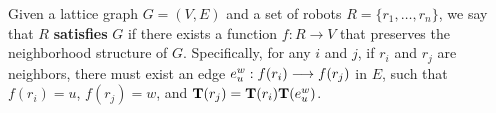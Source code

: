 \begin{figure}
  \centering
  
  \label{fig:edgetrans}
\end{figure}

\begin{defn}
\label{def:selfconsist}
  Given a lattice graph $G=(V, E)$ and a set of robots
    $R = \{ r_1, \ldots, r_n \}$,
  we say that $R$ \textbf{satisfies} $G$ if there exists a function
    $f: R \rightarrow V$
  that preserves the neighborhood structure of $G$.
  Specifically, for any $i$ and $j$, if $r_i$ and $r_j$ are neighbors, 
  there must exist an edge
  $e_u^w: {f(r_i)}\overset{}{\longrightarrow}{f(r_j)}$ in $E$, such that 
      $f(r_i) = u$,
      $f(r_j) = w$, and $\mathbf{T}(r_j) = \mathbf{T}(r_i) \mathbf{T}(e_{u}^w)$.
\end{defn}

